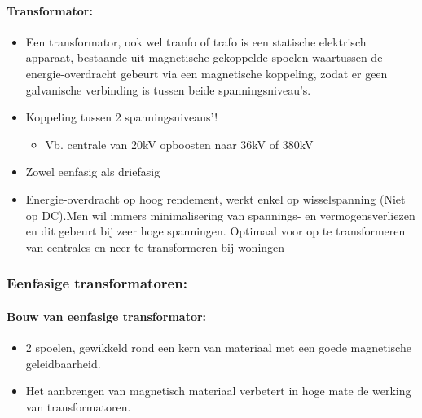\documentclass[12pt]{article}
\begin{document}
\paragraph{Transformator:}
\begin{itemize}
    \item Een transformator, ook wel tranfo of trafo is een statische elektrisch apparaat, bestaande uit magnetische gekoppelde spoelen waartussen de energie-overdracht gebeurt via een magnetische koppeling, zodat er geen galvanische verbinding is tussen beide spanningsniveau's.
    \item Koppeling tussen 2 spanningsniveaus'!\begin{itemize}
        \item Vb. centrale van 20kV opboosten naar 36kV of 380kV
    \end{itemize}
    \item Zowel eenfasig als driefasig 
    \item Energie-overdracht op hoog rendement, werkt enkel op wisselspanning (Niet op DC).Men wil immers minimalisering van spannings- en vermogensverliezen en dit gebeurt bij zeer hoge
    spanningen. Optimaal voor op te transformeren van centrales en neer te transformeren bij woningen
\end{itemize}
\subsubsection{Eenfasige transformatoren:}
\paragraph{Bouw van eenfasige transformator:}
\begin{itemize}
    \item 2 spoelen, gewikkeld rond een kern van materiaal met een goede magnetische geleidbaarheid. 
    \item Het aanbrengen van magnetisch materiaal verbetert in hoge mate de werking van transformatoren.
\end{itemize}
\end{document}
